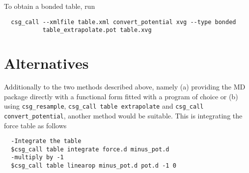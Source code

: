To obtain a bonded table, run
\begin{verbatim}
  csg_call --xmlfile table.xml convert_potential xvg --type bonded
           table_extrapolate.pot table.xvg
\end{verbatim}

\section{Alternatives}
Additionally to the two methods described above, namely (a) providing the MD package directly with a functional form fitted with a program of choice or (b) using \texttt{csg\_resample}, \texttt{csg\_call table extrapolate} and \texttt{csg\_call convert\_potential}, another method would be suitable. This is integrating the force table as follows
\begin{verbatim}
  -Integrate the table
  $csg_call table integrate force.d minus_pot.d
  -multiply by -1
  $csg_call table linearop minus_pot.d pot.d -1 0
\end{verbatim}